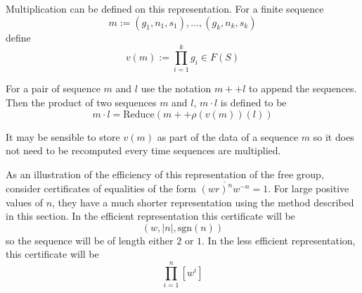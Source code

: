 \documentclass[12pt]{article} %
\theoremstyle{definition}
\theoremstyle{definition}
\theoremstyle{definition}
\theoremstyle{definition}
\theoremstyle{definition}
\theoremstyle{definition}
\begin{document}


Multiplication can be defined on this representation.
For a finite sequence
\begin{equation}
  m := (g_1, n_1, s_1), \dots, (g_k, n_k, s_k)
\end{equation}
define
\begin{equation}
  v(m) := \prod_{i=1}^k g_i \in F(S)
\end{equation}

For a pair of sequence $m$ and $l$ use the notation $m ++ l$ to append the sequences.
Then the product of two sequences $m$ and $l$, $m \cdot l$ is defined to be
\begin{equation}
  m \cdot l = \text{Reduce}(m ++ \rho(v(m))(l))
\end{equation}

It may be sensible to store $v(m)$ as part of the data of a sequence $m$ so it does not
need to be recomputed every time sequences are multiplied.

As an illustration of the efficiency of this
representation of the free group, consider certificates of equalities
of the form $\overline{(wr)^n w^{-n}} = 1$. For
large positive values of $n$, they
have a much shorter representation using the method described in this section.
In the efficient representation this certificate will be
\begin{equation}
  (w, |n|, \text{sgn}(n))
\end{equation}
so the sequence
will be of length either $2$ or $1$. In the less efficient representation,
this certificate will be
\begin{equation}
  \prod_{i=1}^n [w^i]
\end{equation}
\end{document}
